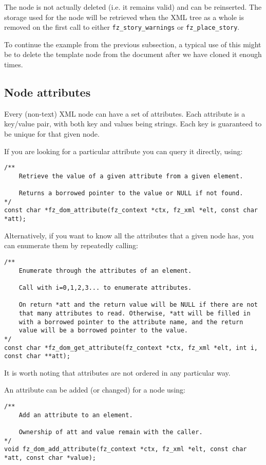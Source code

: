 \documentclass[oneside]{book}
\begin{document}
The node is not actually deleted (i.e. it remains valid) and can be reinserted. The storage used for the node will be retrieved when the XML tree as a whole is removed on the first call to either \texttt{fz\_story\_warnings} or \texttt{fz\_place\_story}.

To continue the example from the previous subsection, a typical use of this might be to delete the template node from the document after we have cloned it enough times.

\subsection{Node attributes}
\label{DOMNodeAttributes}
Every (non-text) XML node can have a set of attributes. Each attribute is a key/value pair, with both key and values being strings. Each key is guaranteed to be unique for that given node.

If you are looking for a particular attribute you can query it directly, using:

\begin{lstlisting}
/**
	Retrieve the value of a given attribute from a given element.

	Returns a borrowed pointer to the value or NULL if not found.
*/
const char *fz_dom_attribute(fz_context *ctx, fz_xml *elt, const char *att);
\end{lstlisting}

Alternatively, if you want to know all the attributes that a given node has, you can enumerate them by repeatedly calling:

\begin{lstlisting}
/**
	Enumerate through the attributes of an element.

	Call with i=0,1,2,3... to enumerate attributes.

	On return *att and the return value will be NULL if there are not
	that many attributes to read. Otherwise, *att will be filled in
	with a borrowed pointer to the attribute name, and the return
	value will be a borrowed pointer to the value.
*/
const char *fz_dom_get_attribute(fz_context *ctx, fz_xml *elt, int i, const char **att);
\end{lstlisting}

It is worth noting that attributes are not ordered in any particular way.

An attribute can be added (or changed) for a node using:

\begin{lstlisting}
/**
	Add an attribute to an element.

	Ownership of att and value remain with the caller.
*/
void fz_dom_add_attribute(fz_context *ctx, fz_xml *elt, const char *att, const char *value);
\end{lstlisting}
\end{document}
